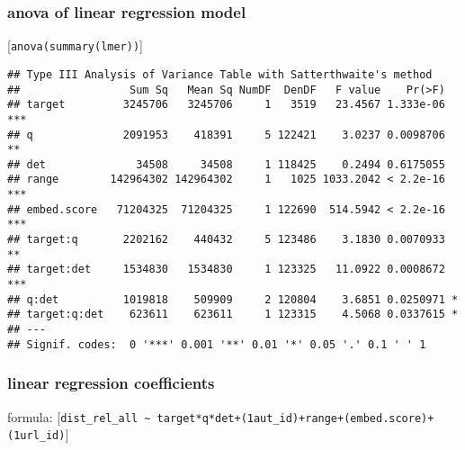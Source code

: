 \documentclass[
  12pt,
  oneside]{book}
\begin{document}
\subsubsection{anova of linear regression model}\label{anova-of-linear-regression-model-2}

{[}\texttt{anova(summary(lmer))}{]}

\begin{verbatim}
## Type III Analysis of Variance Table with Satterthwaite's method
##                 Sum Sq   Mean Sq NumDF  DenDF   F value    Pr(>F)    
## target         3245706   3245706     1   3519   23.4567 1.333e-06 ***
## q              2091953    418391     5 122421    3.0237 0.0098706 ** 
## det              34508     34508     1 118425    0.2494 0.6175055    
## range        142964302 142964302     1   1025 1033.2042 < 2.2e-16 ***
## embed.score   71204325  71204325     1 122690  514.5942 < 2.2e-16 ***
## target:q       2202162    440432     5 123486    3.1830 0.0070933 ** 
## target:det     1534830   1534830     1 123325   11.0922 0.0008672 ***
## q:det          1019818    509909     2 120804    3.6851 0.0250971 *  
## target:q:det    623611    623611     1 123315    4.5068 0.0337615 *  
## ---
## Signif. codes:  0 '***' 0.001 '**' 0.01 '*' 0.05 '.' 0.1 ' ' 1
\end{verbatim}

\subsubsection{linear regression coefficients}\label{linear-regression-coefficients-2}

formula: {[}\texttt{dist\_rel\_all\ \textasciitilde{}\ target*q*det+(1\textbar{}aut\_id)+range+(embed.score)+(1\textbar{}url\_id)}{]}
\end{document}
